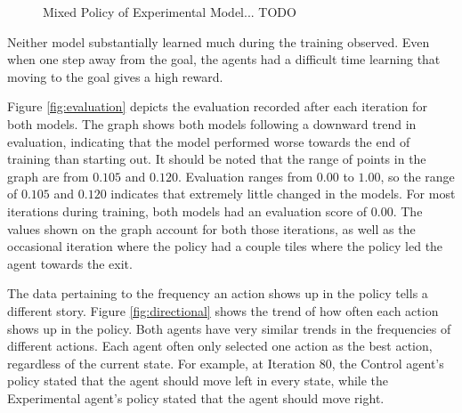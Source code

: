 \documentclass[12pt]{article}
\begin{document}
\begin{figure}[h]
	\begin{center}
		\begin{subfigure}{0.4\linewidth}
			
			\label{fig:policy_350}
		\end{subfigure}
		\hspace{0.1in}
		\begin{subfigure}{0.4\linewidth}
			
			\label{fig:policy_400}
		\end{subfigure}
	\end{center}
	\begin{center}
		\begin{subfigure}{0.4\linewidth}
			
			\label{fig:policy_450}
		\end{subfigure}
		\hspace{0.1in}
		\begin{subfigure}{0.4\linewidth}
			
			\label{fig:policy_500}
		\end{subfigure}
	\end{center}
	\caption{Mixed Policy of Experimental Model... TODO}
	\label{fig:policy}
\end{figure}

Neither model substantially learned much during the training observed.
Even when one step away from the goal, the agents had a difficult time learning that moving to the goal gives a high reward.

Figure \ref{fig:evaluation} depicts the evaluation recorded after each iteration for both models.
The graph shows both models following a downward trend in evaluation, indicating that the model performed worse towards the end of training than starting out.
It should be noted that the range of points in the graph are from $0.105$ and $0.120$.
Evaluation ranges from $0.00$ to $1.00$, so the range of $0.105$ and $0.120$ indicates that extremely little changed in the models.
For most iterations during training, both models had an evaluation score of $0.00$.
The values shown on the graph account for both those iterations, as well as the occasional iteration where the policy had a couple tiles where the policy led the agent towards the exit.

The data pertaining to the frequency an action shows up in the policy tells a different story.
Figure \ref{fig:directional} shows the trend of how often each action shows up in the policy.
Both agents have very similar trends in the frequencies of different actions.
Each agent often only selected one action as the best action, regardless of the current state.
For example, at Iteration 80, the Control agent's policy stated that the agent should move left in every state, while the Experimental agent's policy stated that the agent should move right.
\end{document}
